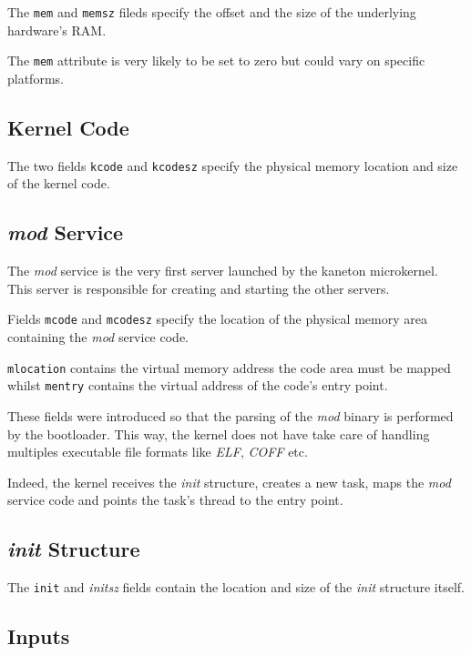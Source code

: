 The \texttt{mem} and \texttt{memsz} fileds specify the offset and the size of
the underlying hardware's RAM.

The \texttt{mem} attribute is very likely to be set to zero but could
vary on specific platforms.


\subsection*{Kernel Code}

The two fields \texttt{kcode} and \texttt{kcodesz} specify the physical memory
location and size of the kernel code.


\subsection*{\textit{mod} Service}

The \textit{mod} service is the very first server launched by the kaneton
microkernel. This server is responsible for creating and starting the
other servers.

Fields \texttt{mcode} and \texttt{mcodesz} specify the location of the physical
memory area containing the \textit{mod} service code.

\texttt{mlocation} contains the virtual memory address the code area must
be mapped whilst \texttt{mentry} contains the virtual address of the code's
entry point.

These fields were introduced so that the parsing of the \textit{mod} binary
is performed by the bootloader. This way, the kernel does not have take
care of handling multiples executable file formats like \textit{ELF},
\textit{COFF} etc.

Indeed, the kernel receives the \textit{init} structure, creates a new task,
maps the \textit{mod} service code and points the task's thread to the
entry point.


\subsection*{\textit{init} Structure}

The \texttt{init} and \textit{initsz} fields contain the location and size
of the \textit{init} structure itself.


\subsection*{Inputs}

